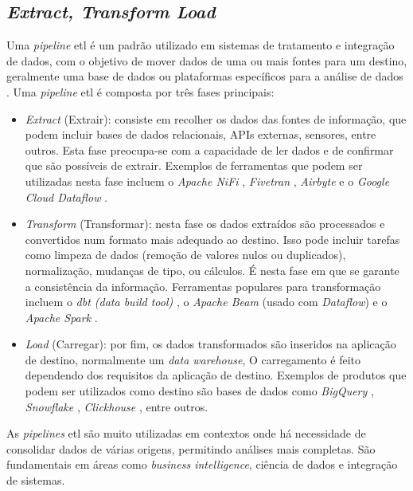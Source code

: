\subsection{\textit{Extract, Transform Load}}
\label{ch:etl}

Uma \textit{pipeline} \gls{etl} é um padrão utilizado em sistemas de tratamento e integração de dados, com o objetivo de mover dados de uma ou mais fontes para um destino, geralmente uma base de dados ou plataformas específicos para a análise de dados \cite{vassiliadis2009survey}. Uma \textit{pipeline} \gls{etl} é composta por três fases principais:

\begin{itemize}
  \item \textit{Extract} (Extrair): consiste em recolher os dados das fontes de informação, que podem incluir bases de dados relacionais, APIs externas, sensores, entre outros. Esta fase preocupa-se com a capacidade de ler dados e de confirmar que são possíveis de extrair.  Exemplos de ferramentas que podem ser utilizadas nesta fase incluem o \textit{Apache NiFi} \cite{apache_nifi}, \textit{Fivetran} \cite{fivetran}, \textit{Airbyte} \cite{airbyte} e o \textit{Google Cloud Dataflow} \cite{dataflow}.
  
  \item \textit{Transform} (Transformar): nesta fase os dados extraídos são processados e convertidos num formato mais adequado ao destino. Isso pode incluir tarefas como limpeza de dados (remoção de valores nulos ou duplicados), normalização, mudanças de tipo, ou cálculos. É nesta fase em que se garante a consistência da informação. Ferramentas populares para transformação incluem o \textit{dbt (data build tool)} \cite{dbt}, o \textit{Apache Beam} \cite{apache_beam} (usado com \textit{Dataflow}) e o \textit{Apache Spark} \cite{apache_spark}.

  \item \textit{Load} (Carregar): por fim, os dados transformados são inseridos na aplicação de destino, normalmente um \textit{data warehouse},  O carregamento é feito dependendo dos requisitos da aplicação de destino. Exemplos de produtos que podem ser utilizados como destino são bases de dados como \textit{BigQuery} \cite{bigquery}, \textit{Snowflake} \cite{snowflake}, \textit{Clickhouse} \cite{clickhouse}, entre outros.

\end{itemize}

As \textit{pipelines} \gls{etl} são muito utilizadas em contextos onde há necessidade de consolidar dados de várias origens, permitindo análises mais completas. São fundamentais em áreas como \textit{business intelligence}, ciência de dados e integração de sistemas.


